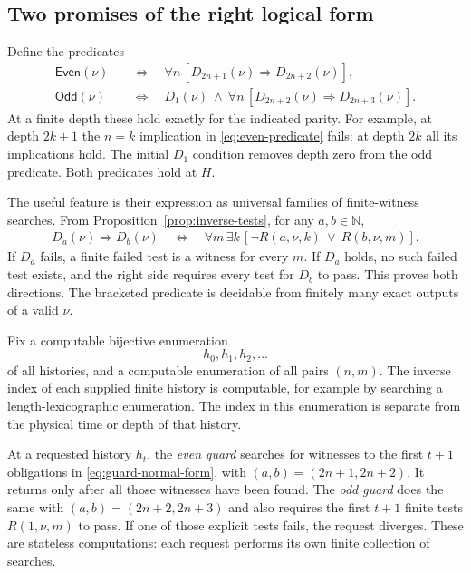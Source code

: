 \documentclass[11pt]{article}
\theoremstyle{definition}
\theoremstyle{remark}
\newcommand{\N}{\mathbb N}
\begin{document}
\subsection{Two promises of the right logical form}

Define the predicates
\begin{align}
  \mathsf{Even}(\nu)
    &\quad\Longleftrightarrow\quad
       \forall n\,[D_{2n+1}(\nu)\Rightarrow D_{2n+2}(\nu)],
       \label{eq:even-predicate}\\
  \mathsf{Odd}(\nu)
    &\quad\Longleftrightarrow\quad
       D_1(\nu)\ \wedge\
       \forall n\,[D_{2n+2}(\nu)\Rightarrow D_{2n+3}(\nu)].
       \label{eq:odd-predicate}
\end{align}
At a finite depth these hold exactly for the indicated parity.  For
example, at depth $2k+1$ the $n=k$ implication in
\eqref{eq:even-predicate} fails; at depth $2k$ all its implications
hold.  The initial $D_1$ condition removes depth zero from the odd
predicate.  Both predicates hold at $H$.

The useful feature is their expression as universal families of
finite-witness searches.  From Proposition~\ref{prop:inverse-tests},
for any $a,b\in\N$,
\begin{equation}
 \begin{split}
  D_a(\nu)\Rightarrow D_b(\nu)
  \quad\Longleftrightarrow\quad
  \forall m\,\exists k\,
      [\neg R(a,\nu,k)\ \lor\ R(b,\nu,m)].
 \end{split}
 \label{eq:guard-normal-form}
\end{equation}
If $D_a$ fails, a finite failed test is a witness for every $m$.
If $D_a$ holds, no such failed test exists, and the right side
requires every test for $D_b$ to pass.  This proves both directions.
The bracketed predicate is decidable from finitely many exact outputs
of a valid $\nu$.

Fix a computable bijective enumeration
\[
  h_0,h_1,h_2,\ldots
\]
of all histories, and a computable enumeration of all pairs $(n,m)$.
The inverse index of each supplied finite history is computable, for
example by searching a length-lexicographic enumeration.  The index
in this enumeration is separate from the physical time or depth of
that history.

At a requested history $h_t$, the \emph{even guard} searches for
witnesses to the first $t+1$ obligations in
\eqref{eq:guard-normal-form}, with
$(a,b)=(2n+1,2n+2)$.  It returns only after all those witnesses have
been found.  The \emph{odd guard} does the same with
$(a,b)=(2n+2,2n+3)$ and also requires the first $t+1$ finite tests
$R(1,\nu,m)$ to pass.  If one of those explicit tests fails, the
request diverges.  These are stateless computations: each request
performs its own finite collection of searches.
\end{document}
